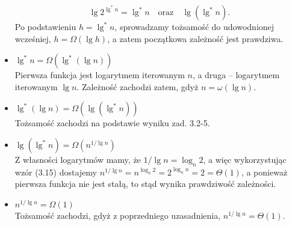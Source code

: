 \begin{itemize}
	\[
		\lg 2^{\lg^*n} = \lg^*n\quad\mbox{oraz}\quad\lg(\lg^*n).
	\]
	Po podstawieniu $h=\lg^*n$, sprowadzamy tożsamość do udowodnionej wcześniej, $h=\Omega(\lg h)$, a zatem początkowa zależność jest prawdziwa.
\item $\lg^*n=\Omega\left(\lg^*(\lg n)\right)$ \\
	Pierwsza funkcja jest logarytmem iterowanym $n$, a druga -- logarytmem iterowanym $\lg n$. Zależność zachodzi zatem, gdyż $n=\omega(\lg n)$.
\item $\lg^*(\lg n)=\Omega\left(\lg(\lg^*n)\right)$ \\
	Tożsamość zachodzi na podstawie wyniku zad. 3.2-5.
\item $\lg(\lg^*n)=\Omega\left(n^{1/\lg n}\right)$ \\
	Z własności logarytmów mamy, że $1/\lg n=\log_n2$, a więc wykorzystując wzór (3.15) dostajemy $n^{1/\lg n}=n^{\log_n2}=2^{\log_nn}=2=\Theta(1)$, a ponieważ pierwsza funkcja nie jest stałą, to stąd wynika prawdziwość zależności.
\item $n^{1/\lg n}=\Omega(1)$ \\
	Tożsamość zachodzi, gdyż z poprzedniego uzasadnienia, $n^{1/\lg n}=\Theta(1)$.
\end{itemize}

